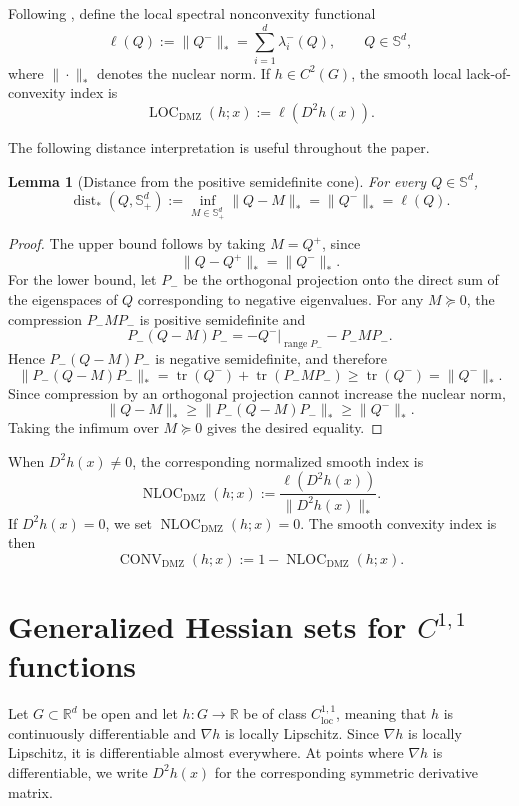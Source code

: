 \documentclass[11pt]{article}
\numberwithin{equation}{section}
\newtheorem{lemma}[theorem]{Lemma}
\newcommand{\R}{\mathbb R}
\newcommand{\Sd}{\mathbb S^d}
\newcommand{\Spd}{\mathbb S^d_+}
\newcommand{\tr}{\operatorname{tr}}
\newcommand{\dist}{\operatorname{dist}}
\newcommand{\LOC}{\operatorname{LOC}}
\newcommand{\NLOC}{\operatorname{NLOC}}
\newcommand{\CONV}{\operatorname{CONV}}
\begin{document}
	Following \cite{davydov2019}, define the local spectral nonconvexity functional
	\[
	\ell(Q)
	:=
	\|Q^-\|_*
	=
	\sum_{i=1}^d \lambda_i^-(Q),
	\qquad Q\in\Sd,
	\]
	where \(\|\cdot\|_*\) denotes the nuclear norm. If \(h\in C^2(G)\), the smooth local lack-of-convexity index is
	\[
	\LOC_{\mathrm{DMZ}}(h;x)
	:=
	\ell(D^2h(x)).
	\]
	
	The following distance interpretation is useful throughout the paper.
	
	\begin{lemma}[Distance from the positive semidefinite cone]
		\label{lem:distance}
		For every \(Q\in\Sd\),
		\[
		\dist_*(Q,\Spd)
		:=
		\inf_{M\in\Spd}\|Q-M\|_*
		=
		\|Q^-\|_*
		=
		\ell(Q).
		\]
	\end{lemma}
	
	\begin{proof}
		The upper bound follows by taking \(M=Q^+\), since
		\[
		\|Q-Q^+\|_*=\|Q^-\|_*.
		\]
		For the lower bound, let \(P_-\) be the orthogonal projection onto the direct sum of the eigenspaces of \(Q\) corresponding to negative eigenvalues. For any \(M\succeq 0\), the compression \(P_-MP_-\) is positive semidefinite and
		\[
		P_-(Q-M)P_-
		=
		-Q^-|_{\operatorname{range}P_-}
		-
		P_-MP_-.
		\]
		Hence \(P_-(Q-M)P_-\) is negative semidefinite, and therefore
		\[
		\|P_-(Q-M)P_-\|_*
		=
		\tr(Q^-)+\tr(P_-MP_-)
		\geq
		\tr(Q^-)
		=
		\|Q^-\|_*.
		\]
		Since compression by an orthogonal projection cannot increase the nuclear norm,
		\[
		\|Q-M\|_*
		\geq
		\|P_-(Q-M)P_-\|_*
		\geq
		\|Q^-\|_*.
		\]
		Taking the infimum over \(M\succeq0\) gives the desired equality.
	\end{proof}
	
	When \(D^2h(x)\neq 0\), the corresponding normalized smooth index is
	\[
	\NLOC_{\mathrm{DMZ}}(h;x)
	:=
	\frac{\ell(D^2h(x))}{\|D^2h(x)\|_*}.
	\]
	If \(D^2h(x)=0\), we set \(\NLOC_{\mathrm{DMZ}}(h;x)=0\). The smooth convexity index is then
	\[
	\CONV_{\mathrm{DMZ}}(h;x)
	:=
	1-\NLOC_{\mathrm{DMZ}}(h;x).
	\]
	
	\section{Generalized Hessian sets for \(C^{1,1}\) functions}
	
	Let \(G\subset\R^d\) be open and let \(h:G\to\R\) be of class \(C^{1,1}_{\mathrm{loc}}\), meaning that \(h\) is continuously differentiable and \(\nabla h\) is locally Lipschitz. Since \(\nabla h\) is locally Lipschitz, it is differentiable almost everywhere. At points where \(\nabla h\) is differentiable, we write \(D^2h(x)\) for the corresponding symmetric derivative matrix.
	
\end{document}
